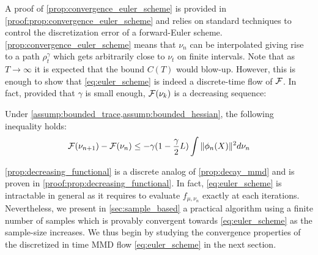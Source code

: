  A proof of \cref{prop:convergence_euler_scheme} is provided in \cref{proof:prop:convergence_euler_scheme} and relies on standard techniques to control the discretization error of a forward-Euler scheme.
\cref{prop:convergence_euler_scheme} means that $\nu_n$ can be interpolated giving rise to a path $\rho_t^{\gamma}$ which gets arbitrarily close to $\nu_t$ on finite intervals. Note that as $T \rightarrow \infty$ it is expected that the bound $C(T)$ would blow-up. However, this is enough to show that \cref{eq:euler_scheme} is indeed a discrete-time flow of ${{\mathcal F}}$. In fact, provided that $\gamma$ is small enough, ${{\mathcal F}}(\nu_k)$ is a decreasing sequence:
\begin{proposition}\label{prop:decreasing_functional}
	Under \cref{assump:bounded_trace,assump:bounded_hessian}, the following inequality holds:
	\begin{align*}
	{{\mathcal F}}(\nu_{n+1})-{{\mathcal F}}(\nu_n)\leq -\gamma (1-\frac{\gamma}{2}L )\int \Vert \phi_n(X)\Vert^2 d\nu_n
	\end{align*}
\end{proposition}
\cref{prop:decreasing_functional} is a discrete analog of \cref{prop:decay_mmd} and is proven in \cref{proof:prop:decreasing_functional}. In fact, \cref{eq:euler_scheme} is intractable in general as it requires to evaluate $f_{\mu,\nu_n}$ exactly at each iterations. Nevertheless, we present in \cref{sec:sample_based} a practical algorithm using a finite number of samples which is provably convergent towards \cref{eq:euler_scheme} as the sample-size increases. We thus begin by studying the convergence properties of the discretized in time MMD flow \eqref{eq:euler_scheme} in the next section. 
